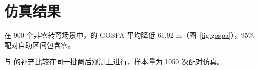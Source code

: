\section{仿真结果}
在 900 个非零转弯场景中，\method 的 GOSPA 平均降低 61.92 m（图~\ref{fig:gospa}），95\% 配对自助区间包含零。

与 \gtmethod 的补充比较在同一批阈后观测上进行，样本量为 1050 次配对仿真。
